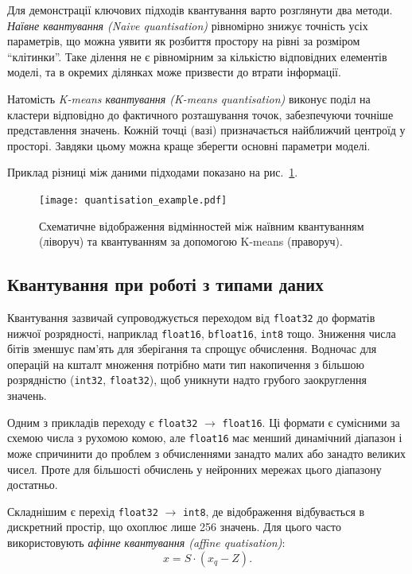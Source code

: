Для демонстрації ключових підходів квантування варто розглянути два методи. \emph{Наївне квантування (Naive quantisation)} рівномірно знижує точність усіх параметрів, що можна уявити як розбиття простору на рівні за розміром ``клітинки''. Таке ділення не є рівномірним за кількістю відповідних елементів моделі, та в окремих ділянках може призвести до втрати інформації.

Натомість \emph{K-means квантування (K-means quantisation)} виконує поділ на кластери відповідно до фактичного розташування точок, забезпечуючи точніше представлення значень. Кожній точці (вазі) призначається найближчий центроїд у просторі. Завдяки цьому можна краще зберегти основні параметри моделі.

Приклад різниці між даними підходами показано на рис.~\ref{fig:quantisation}.

\begin{figure}[h]
    \centering
    \texttt{[image: quantisation\_example.pdf]}
    \caption{Схематичне відображення відмінностей між наївним квантуванням (ліворуч) та квантуванням за допомогою K-means (праворуч).}
    \label{fig:quantisation}
\end{figure}

\subsection{Квантування при роботі з типами даних}

Квантування зазвичай супроводжується переходом від \texttt{float32} до форматів нижчої розрядності, наприклад \texttt{float16}, \texttt{bfloat16}, \texttt{int8} тощо. Зниження числа бітів зменшує пам’ять для зберігання та спрощує обчислення. Водночас для операцій на кшталт множення потрібно мати тип накопичення з більшою розрядністю (\texttt{int32}, \texttt{float32}), щоб уникнути надто грубого заокруглення значень.

Одним з прикладів переходу є \texttt{float32} $\rightarrow$ \texttt{float16}. Ці формати є сумісними за схемою числа з рухомою комою, але \texttt{float16} має менший динамічний діапазон і може спричинити до проблем з обчисленнями занадто малих або занадто великих чисел. Проте для більшості обчислень у нейронних мережах цього діапазону достатньо.

Складнішим є перехід \texttt{float32} $\rightarrow$ \texttt{int8}, де відображення відбувається в дискретний простір, що охоплює лише 256 значень. Для цього часто використовують \emph{афінне квантування (affine quatisation)}:
\begin{equation}
x = S \cdot (x_q - Z).
\end{equation}

